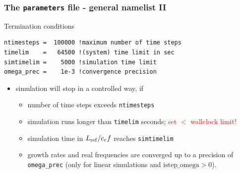 \documentclass[10pt]{beamer}
\newcommand{\cR}[1]{\textcolor{red}{#1}}
\begin{document}
\begin{frame}[fragile]
  \frametitle{The {\tt parameters} file - general namelist II}

\begin{block}{Termination conditions}

\begin{block}

\begin{verbatim}
ntimesteps =  100000 !maximum number of time steps
timelim    =   64500 !(system) time limit in sec
simtimelim =    5000 !simulation time limit
omega_prec =    1e-3 !convergence precision 
\end{verbatim}
\end{block}
\begin{itemize}
\item simulation will stop in a controlled way, if
\begin{itemize}
\item number of time steps exceeds {\tt ntimesteps}
\item simulation runs longer than {\tt timelim} seconds; \cR{set $<$ wallclock limit!}
\item simulation time in $L_{\rm ref}/c_rf$ reaches {\tt simtimelim}
\item growth rates and real frequencies are converged up to a
precision of {\tt omega\_prec} (only for linear simulations
and $\textrm{istep\_omega} > 0$).
\end{itemize}
\end{itemize}
\end{block}

\end{frame}

\end{document}
